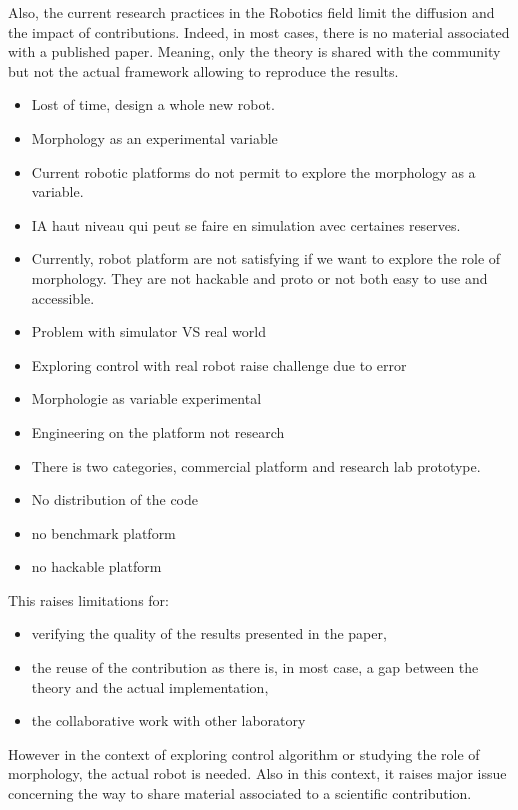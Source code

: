 Also, the current research practices in the Robotics field limit the diffusion and the impact of contributions.
Indeed, in most cases, there is no material associated with a published paper.
Meaning, only the theory is shared with the community but not the actual framework allowing to reproduce the results.

\begin{itemize}
    \item Lost of time, design a whole new robot.
    \item Morphology as an experimental variable
    \item Current robotic platforms do not permit to explore the morphology as a variable.
    \item IA haut niveau qui peut se faire en simulation avec certaines reserves.
    \item Currently, robot platform are not satisfying if we want to explore the role of morphology.
    They are not hackable and proto or not both easy to use and accessible.
    \item Problem with simulator VS real world
    \item Exploring control with real robot raise challenge due to error
    \item Morphologie as variable experimental
    \item Engineering on the platform not research
    \item There is two categories, commercial platform and research lab prototype.
    \item No distribution of the code
    \item no benchmark platform
    \item no hackable platform
\end{itemize}

This raises limitations for:
\begin{itemize}
    \item verifying the quality of the results presented in the paper,
    \item the reuse of the contribution as there is, in most case, a gap between the theory and the actual implementation,
    \item the collaborative work with other laboratory
\end{itemize}

However in the context of exploring control algorithm or studying the role of morphology, the actual robot is needed.
Also in this context, it raises major issue concerning the way to share material associated to a scientific contribution.

